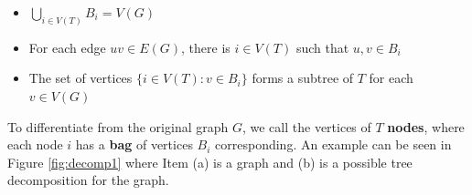 \begin{itemize}
    \item \(\bigcup_{i \in V(T)} B_i = V(G)\)
    \item For each edge \(uv \in E(G)\), there is \(i \in V(T)\) such that \(u, v \in B_i\)
    \item The set of vertices \(\{i \in V(T) \colon v \in B_i\}\) forms a subtree of \(T\) for each \(v \in V(G)\)
\end{itemize}



To differentiate from the original graph \(G\), we call the vertices of \(T\) \textbf{nodes}, where each node \(i\) has a \textbf{bag} of vertices \(B_i\) corresponding. An example can be seen in Figure \ref{fig:decomp1} where Item (a) is a graph and (b) is a possible tree decomposition for the graph.


